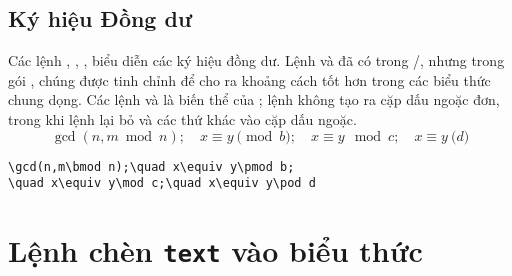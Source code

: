 \documentclass[11pt,leqno,titlepage,openany]{amsldoc}[1999/12/13]
\begin{document}
\section{Ký hiệu Đồng dư}

Các lệnh , , ,  biểu diễn các ký hiệu
đồng dư. Lệnh  và  đã có trong \latex/, nhưng trong gói
, chúng được tinh chỉnh để cho ra khoảng cách tốt hơn trong
các biểu thức chung dọng. Các lệnh  và  là biến thể của
; lệnh  không tạo ra cặp dấu ngoặc đơn, trong khi lệnh 
 lại bỏ  và các thứ khác vào cặp dấu ngoặc.
\begin{equation}
\gcd(n,m\bmod n);\quad x\equiv y\pmod b;
\quad x\equiv y\mod c;\quad x\equiv y\pod d
\end{equation}
\begin{verbatim}
\gcd(n,m\bmod n);\quad x\equiv y\pmod b;
\quad x\equiv y\mod c;\quad x\equiv y\pod d
\end{verbatim}

\chapter{Lệnh  chèn \texttt{text} vào biểu thức}\label{text}
\end{document}
